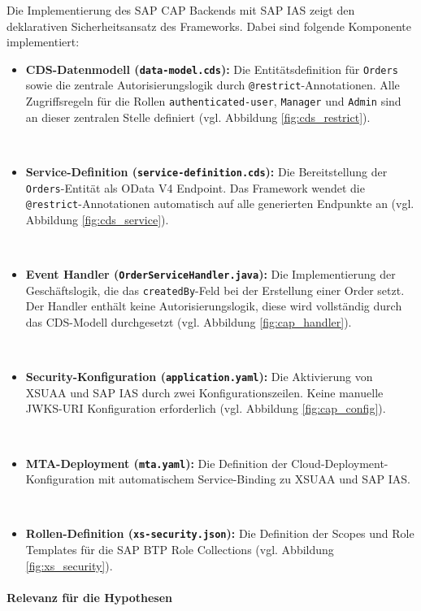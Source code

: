 Die Implementierung des \ac{SAP CAP} Backends mit \ac{SAP IAS} zeigt den deklarativen Sicherheitsansatz des Frameworks. Dabei sind folgende Komponente implementiert:

\begin{itemize}
    \item \textbf{CDS-Datenmodell (\texttt{data-model.cds}):} Die Entitätsdefinition für \texttt{Orders} sowie die zentrale Autorisierungslogik durch \texttt{@restrict}-Annotationen. Alle Zugriffsregeln für die Rollen \texttt{authenticated-user}, \texttt{Manager} und \texttt{Admin} sind an dieser zentralen Stelle definiert (vgl. Abbildung \ref{fig:cds_restrict}).

    \item \textbf{Service-Definition (\texttt{service-definition.cds}):} Die Bereitstellung der \texttt{Orders}-Entität als OData V4 Endpoint. Das Framework wendet die \texttt{@restrict}-Annotationen automatisch auf alle generierten Endpunkte an (vgl. Abbildung \ref{fig:cds_service}).

    \item \textbf{Event Handler (\texttt{OrderServiceHandler.java}):} Die Implementierung der Geschäftslogik, die das \texttt{createdBy}-Feld bei der Erstellung einer Order setzt. Der Handler enthält keine Autorisierungslogik, diese wird vollständig durch das \ac{CDS}-Modell durchgesetzt (vgl. Abbildung \ref{fig:cap_handler}).

    \item \textbf{Security-Konfiguration (\texttt{application.yaml}):} Die Aktivierung von \ac{XSUAA} und \ac{SAP IAS} durch zwei Konfigurationszeilen. Keine manuelle \ac{JWKS}-\ac{URI} Konfiguration erforderlich (vgl. Abbildung \ref{fig:cap_config}).

    \item \textbf{MTA-Deployment (\texttt{mta.yaml}):} Die Definition der Cloud-Deployment-Konfiguration mit automatischem Service-Binding zu \ac{XSUAA} und \ac{SAP IAS}.

    \item \textbf{Rollen-Definition (\texttt{xs-security.json}):} Die Definition der Scopes und Role Templates für die \ac{SAP BTP} Role Collections (vgl. Abbildung \ref{fig:xs_security}).
\end{itemize}

\paragraph{Relevanz für die Hypothesen}

